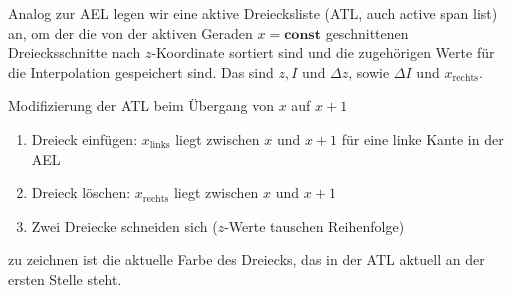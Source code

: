\begin{description}
	Analog zur AEL legen wir eine aktive Dreiecksliste (ATL, auch active span list) an, om der die von der aktiven
	Geraden $x = \mathbf{const}$ geschnittenen Dreiecksschnitte nach $z$-Koordinate sortiert sind und die zugehörigen
	Werte für die Interpolation gespeichert sind. Das sind $z, I$ und $\Delta z$, sowie $\Delta I$ und $x_{\mathrm{rechts}}$.

	Modifizierung der ATL beim Übergang von $x$ auf $x+1$
	\begin{enumerate}
	 \item Dreieck einfügen: $x_{\mathrm{links}}$ liegt zwischen $x$ und $x+1$ für eine linke
		Kante in der AEL
	 \item Dreieck löschen: $x_{\mathrm{rechts}}$ liegt zwischen $x$ und $x+1$
	 \item Zwei Dreiecke schneiden sich ($z$-Werte tauschen Reihenfolge)
	\end{enumerate}
	zu zeichnen ist die aktuelle Farbe des Dreiecks, das in der ATL aktuell an der ersten Stelle steht.
\end{description}

